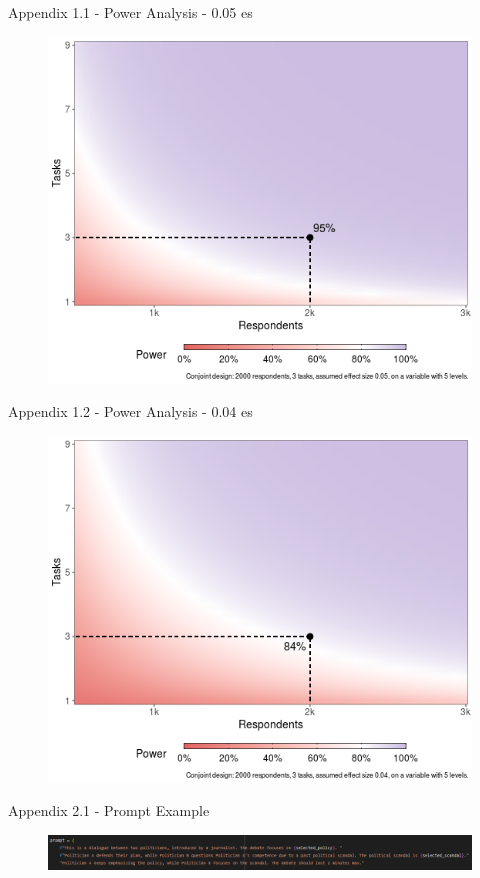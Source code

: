 \documentclass[9pt, aspectratio=169]{beamer}
\begin{document}
\begin{frame}
    \centering
    \vspace*{2em}
    \printbibliography
\end{frame}

\begin{frame}{Appendix 1.1 - Power Analysis - 0.05 es}
    \begin{figure}
        \centering
        \includegraphics[width=0.6\linewidth]{images/pa_3task.png}
        \label{fig:appendix1}
    \end{figure}
\end{frame}

\begin{frame}{Appendix 1.2 - Power Analysis - 0.04 es}
    \begin{figure}
        \centering
        \includegraphics[width=0.6\linewidth]{images/pa_3task_0.4effect.png}
        \label{fig:appendix2}
    \end{figure}    
\end{frame}

\begin{frame}{Appendix 2.1 - Prompt Example}
        \begin{figure}
        \centering
        \includegraphics[width=\linewidth]{images/Prompt 1.png}
        \label{fig:appendix_prompt1}
    \end{figure}  
\end{frame}
\end{document}
